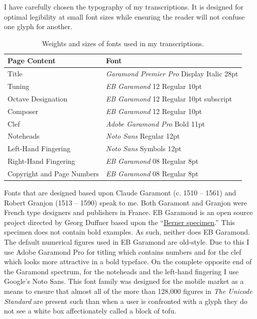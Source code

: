 \documentclass[unicode,hyperfootnotes=false,xetex,colorlinks=true,nofonts,nobib]{tufte-handout}
\begin{document}
I have carefully chosen the typography of my transcriptions. It is designed for optimal legibility at small font sizes while ensuring the reader will not confuse one glyph for another.
  \begin{table}\centering
    \small
    \begin{tabular}{l l}\toprule
      Page Content  & Font \\\midrule
      Title & \emph{Garamond Premier Pro} Display Italic 28pt\\
      Tuning & \emph{EB Garamond} 12 Regular 10pt\\
      Octave Designation & \emph{EB Garamond} 12 Regular 10pt subscript\\
      Composer & \emph{EB Garamond} 12 Regular 10pt\\
      Clef & \emph{Adobe Garamond Pro} Bold 11pt\\
      Noteheads & \emph{Noto Sans} Regular 12pt\\
      Left-Hand Fingering & \emph{Noto Sans} Symbols 12pt\\
      Right-Hand Fingering & \emph{EB Garamond} 08 Regular 8pt\\
      Copyright and Page Numbers & \emph{EB Garamond} 08 Regular 8pt\\
      \bottomrule
  \end{tabular}
    \caption{Weights and sizes of fonts used in my transcriptions.}
\end{table}
Fonts that are designed based upon Claude Garamont (c. 1510 -- 1561) and Robert Granjon (1513 -- 1590) speak to me. Both Garamont and Granjon were French type designers and publishers in France. EB Garamond is an open source project directed by Georg Duffner based upon the ``\href{run:specimen.pdf}{Berner specimen}.'' This specimen does not contain bold examples. As such, neither does EB Garamond. The default numerical figures used in EB Garamond are old-style. Due to this I use Adobe Garamond Pro for titling which contains numbers and for the clef which looks more attractive in a bold typeface. On the complete opposite end of the Garamond spectrum, for the noteheads and the left-hand fingering I use Google's Noto Sans. This font family was designed for the mobile market as a means to ensure that almost all of the more than 128,000 figures in \emph{The Unicode Standard} are present such than when a user is confronted with a glyph they do not see a white box affectionately called a block of tofu.
\end{document}
